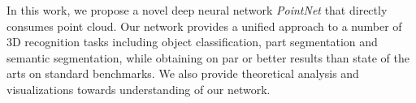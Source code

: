 \label{sec:conclusion}
In this work, we propose a novel deep neural network \emph{PointNet} that directly consumes point cloud. Our network provides a unified approach to a number of 3D recognition tasks including object classification, part segmentation and semantic segmentation, while obtaining on par or better results than state of the arts on standard benchmarks. We also provide theoretical analysis and visualizations towards understanding of our network.

